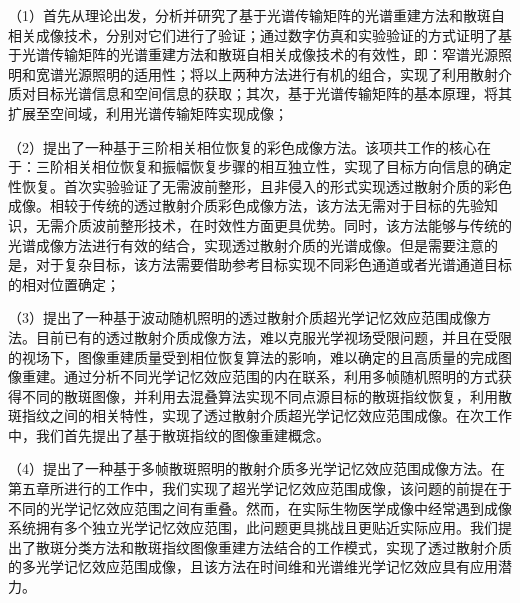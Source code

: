 （1）首先从理论出发，分析并研究了基于光谱传输矩阵的光谱重建方法和散斑自相关成像技术，分别对它们进行了验证；通过数字仿真和实验验证的方式证明了基于光谱传输矩阵的光谱重建方法和散斑自相关成像技术的有效性，即：窄谱光源照明和宽谱光源照明的适用性；将以上两种方法进行有机的组合，实现了利用散射介质对目标光谱信息和空间信息的获取；其次，基于光谱传输矩阵的基本原理，将其扩展至空间域，利用光谱传输矩阵实现成像；

（2）提出了一种基于三阶相关相位恢复的彩色成像方法。该项共工作的核心在于：三阶相关相位恢复和振幅恢复步骤的相互独立性，实现了目标方向信息的确定性恢复。首次实验验证了无需波前整形，且非侵入的形式实现透过散射介质的彩色成像。相较于传统的透过散射介质彩色成像方法，该方法无需对于目标的先验知识，无需介质波前整形技术，在时效性方面更具优势。同时，该方法能够与传统的光谱成像方法进行有效的结合，实现透过散射介质的光谱成像。但是需要注意的是，对于复杂目标，该方法需要借助参考目标实现不同彩色通道或者光谱通道目标的相对位置确定；

（3）提出了一种基于波动随机照明的透过散射介质超光学记忆效应范围成像方法。目前已有的透过散射介质成像方法，难以克服光学视场受限问题，并且在受限的视场下，图像重建质量受到相位恢复算法的影响，难以确定的且高质量的完成图像重建。通过分析不同光学记忆效应范围的内在联系，利用多帧随机照明的方式获得不同的散斑图像，并利用去混叠算法实现不同点源目标的散斑指纹恢复，利用散斑指纹之间的相关特性，实现了透过散射介质超光学记忆效应范围成像。在次工作中，我们首先提出了基于散斑指纹的图像重建概念。

（4）提出了一种基于多帧散斑照明的散射介质多光学记忆效应范围成像方法。在第五章所进行的工作中，我们实现了超光学记忆效应范围成像，该问题的前提在于不同的光学记忆效应范围之间有重叠。然而，在实际生物医学成像中经常遇到成像系统拥有多个独立光学记忆效应范围，此问题更具挑战且更贴近实际应用。我们提出了散斑分类方法和散斑指纹图像重建方法结合的工作模式，实现了透过散射介质的多光学记忆效应范围成像，且该方法在时间维和光谱维光学记忆效应具有应用潜力。
